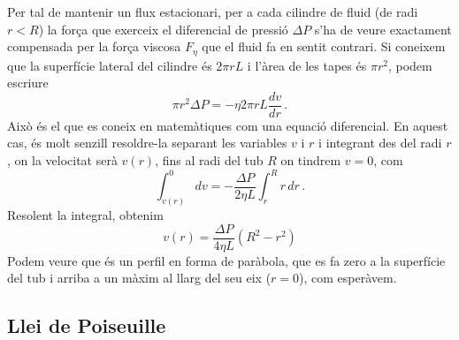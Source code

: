 \documentclass[12pt]{book}
\begin{document}
Per tal de mantenir un flux estacionari, per a cada cilindre de fluid (de radi $r < R$) la força que exerceix el diferencial de pressió $\Delta P$ s'ha de veure exactament compensada per la força viscosa $F_\eta$ que el fluid fa en sentit contrari. Si coneixem que la superfície lateral del cilindre és $2 \pi r L$ i l'àrea de les tapes és $\pi r^2$, podem escriure
%
\begin{equation}
    \pi r^2 \Delta P = - \eta  2 \pi r L  \frac{dv}{dr} \, .
    \label{eqn:FluxEnTub1}
\end{equation}
%
Això és el que es coneix en matemàtiques com una equació diferencial. En aquest cas, és molt senzill resoldre-la separant les variables $v$ i $r$ i integrant des del radi $r$, on la velocitat serà $v(r)$, fins al radi del tub $R$ on tindrem $v=0$, com
%
\begin{equation}
    \int_{v(r)}^0 dv = - \frac{\Delta P}{2 \eta L} \int_r^R r \, dr\, .
    \label{eqn:FluxEnTub2}
\end{equation}
%
Resolent la integral, obtenim 
%
\begin{equation}
    \boxed{v(r) = \frac{\Delta P}{4 \eta L} \left(R^2 - r^2\right)}
    \label{eqn:FluxEnTub2}
\end{equation}
%
Podem veure que és un perfil en forma de paràbola, que es fa zero a la superfície del tub i arriba a un màxim al llarg del seu eix ($r=0$), com esperàvem.

\subsection{Llei de Poiseuille}
\end{document}
